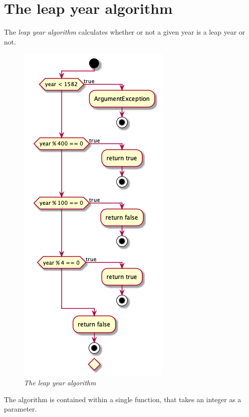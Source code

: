 \documentclass[12pt,letterpaper]{article}
\begin{document}
\section{The leap year algorithm}
The \textit{leap year algorithm} calculates whether or not a given year is a leap year or not.

\begin{figure}
  \begin{center}
   \includegraphics[scale=0.6]{./images/isleapyear_algorithm.png}
  \end{center}
  \caption{\textit{The leap year algorithm}}
\end{figure}

The algorithm is contained within a single function, that takes an integer as a parameter.
\end{document}
